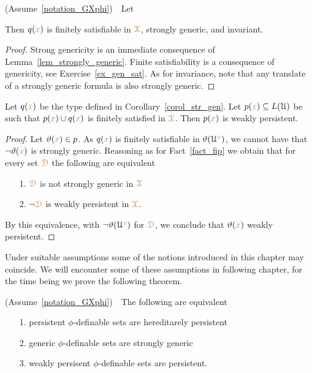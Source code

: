 \begin{corollary}\label{corol_str_gen}
  (Assume~\ref{notation_GXphi})\ \  
  Let 
  

  Then $q({\color{brown} x})$ is finitely satisfiable in ${\color{brown}\EuScript X}$, strongly generic, and invariant.
\end{corollary}

\begin{proof}
  Strong genericity is an immediate consequence of Lemma~\ref{lem_strongly_generic}.
  Finite satisfiability is a consequence of genericity, see Exercise~\ref{ex_gen_sat}.
  As for invariance, note that any translate of a strongly generic formula is also strongly generic.
\end{proof}

\begin{corollary}\label{corol_q_w_pers}
  Let $q({\color{brown} x})$ be the type defined in Corollary~\ref{corol_str_gen}.
  Let $p({\color{brown} x})\subseteq L(\EuScript U)$ be such that $p({\color{brown} x})\cup q({\color{brown} x})$ is finitely satisfied in ${\color{brown}\EuScript X}$.
  Then $p({\color{brown} x})$ is weakly persistent.
\end{corollary}

\begin{proof}
  Let $\vartheta({\color{brown} x})\in p$.
  As $q({\color{brown} x})$ is finitely satisfiable in $\vartheta(\EuScript U^{\color{brown} x})$, we cannot have that $\neg\vartheta({\color{brown} x})$ is strongly generic.
  Reasoning as for Fact~\ref{fact_fip} we obtain that for every set ${\color{brown}\EuScript D}$ the following are equivalent
  \begin{itemize}
    \item[1.] ${\color{brown}\EuScript D}$ is not strongly generic in ${\color{brown}\EuScript X}$
    \item[2.] $\neg{\color{brown}\EuScript D}$ is weakly persistent in ${\color{brown}\EuScript X}$.
  \end{itemize}
  By this equivalence, with $\neg\vartheta(\EuScript U^{\color{brown} x})$ for ${\color{brown}\EuScript D}$, we conclude that $\vartheta({\color{brown} x})$ weakly persistent.
\end{proof}

Under suitable assumptions some of the notions introduced in this chapter may coincide.
We will encounter some of these assumptions in following chapter, for the time being we prove the following theorem.

\begin{theorem}
  (Assume~\ref{notation_GXphi})\ \  
  The following are equivalent
  \begin{itemize}
    \item[1.] persistent $\phi$-definable sets are hereditarely persistent
    \item[2.] generic $\phi$-definable sets are strongly generic
    \item[3.] weakly persisent $\phi$-definable sets are persistent.
  \end{itemize}
\end{theorem}

